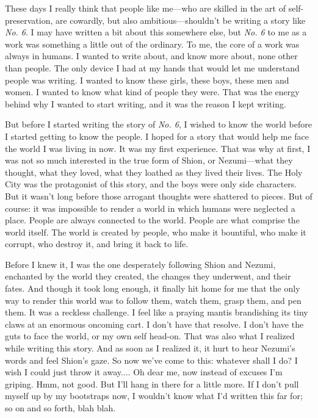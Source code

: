 These days I really think that people like me---who are skilled in the art
of self-preservation, are cowardly, but also ambitious---shouldn't be
writing a story like \emph{No. 6}. I may have written a bit about this
somewhere else, but \emph{No. 6} to me as a work was something a little out of
the ordinary. To me, the core of a work was always in humans. I wanted
to write about, and know more about, none other than people. The only
device I had at my hands that would let me understand people was
writing. I wanted to know these girls, these boys, these men and women.
I wanted to know what kind of people they were. That was the energy
behind why I wanted to start writing, and it was the reason I kept
writing.

But before I started writing the story of \emph{No. 6}, I wished to know the
world before I started getting to know the people. I hoped for a story
that would help me face the world I was living in now. It was my first
experience. That was why at first, I was not so much interested in the
true form of Shion, or Nezumi---what they thought, what they loved, what
they loathed as they lived their lives. The Holy City was the
protagonist of this story, and the boys were only side characters. But
it wasn't long before those arrogant thoughts were shattered to pieces.
But of course: it was impossible to render a world in which humans were
neglected a place. People are always connected to the world. People are
what comprise the world itself. The world is created by people, who make
it bountiful, who make it corrupt, who destroy it, and bring it back to
life.

Before I knew it, I was the one desperately following Shion and Nezumi,
enchanted by the world they created, the changes they underwent, and
their fates. And though it took long enough, it finally hit home for me
that the only way to render this world was to follow them, watch them,
grasp them, and pen them. It was a reckless challenge. I feel like a
praying mantis brandishing its tiny claws at an enormous oncoming cart.
I don't have that resolve. I don't have the guts to face the world, or
my own self head-on. That was also what I realized while writing this
story. And as soon as I realized it, it hurt to hear Nezumi's words and
feel Shion's gaze. So now we've come to this: whatever shall I do? I
wish I could just throw it away.... Oh dear me, now instead of excuses
I'm griping. Hmm, not good. But I'll hang in there for a little more. If
I don't pull myself up by my bootstraps now, I wouldn't know what I'd
written this far for; so on and so forth, blah blah.

